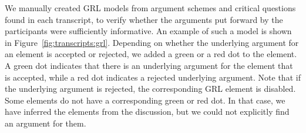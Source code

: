 We manually created GRL models from argument schemes and critical questions found in each transcript, to verify whether the arguments put forward by the participants were sufficiently informative. An example of such a model is shown in Figure~\ref{fig:transcripts:grl}. 
Depending on whether the underlying argument for an element is accepted or rejected, we added a green or a red dot to the element. A green dot indicates that there is an underlying argument for the element that is accepted, while a red dot indicates a rejected underlying argument. Note that if the underlying argument is rejected, the corresponding GRL element is disabled. Some elements do not have a corresponding green or red dot. In that case, we have inferred the elements from the discussion, but we could not explicitly find an argument for them.

